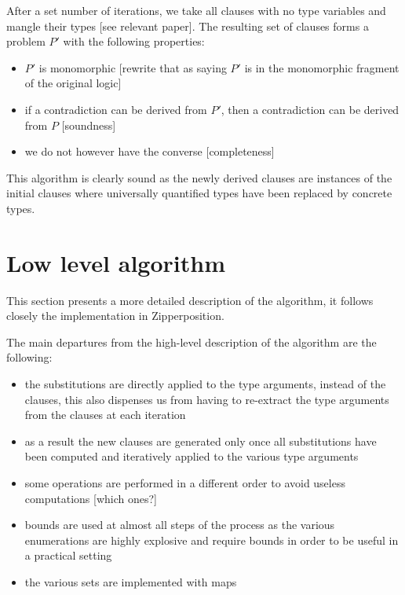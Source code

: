 \documentclass[]{ceurart}
\begin{document}
After a set number of iterations, we take all clauses with no type variables and mangle their types [see relevant paper]. The resulting set of clauses forms a problem \(P'\) with the following properties:
\begin{itemize}
   \item \(P'\) is monomorphic [rewrite that as saying \(P'\) is in the monomorphic fragment of the original logic]
   \item if a contradiction can be derived from \(P'\), then a contradiction can be derived from \(P\) [soundness]
   \item we do not however have the converse [completeness]
\end{itemize}


This algorithm is clearly sound as the newly derived clauses are instances of the initial clauses where universally quantified types have been replaced by concrete types.

\section{Low level algorithm}
\label{sec:low-level-algorithm}

This section presents a more detailed description of the algorithm, it follows closely the implementation in Zipperposition.

The main departures from the high-level description of the algorithm are the following:
\begin{itemize}
   \item the substitutions are directly applied to the type arguments, instead of the clauses, this also dispenses us from having to re-extract the type arguments from the clauses at each iteration
   \item as a result the new clauses are generated only once all substitutions have been computed and iteratively applied to the various type arguments
   \item some operations are performed in a different order to avoid useless computations [which ones?]
   \item bounds are used at almost all steps of the process as the various enumerations are highly explosive and require bounds in order to be useful in a practical setting
   \item the various sets are implemented with maps
\end{itemize}
\end{document}
